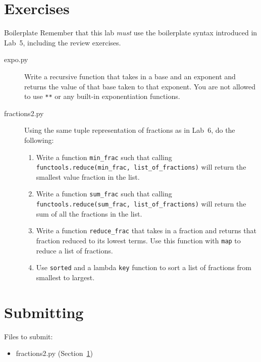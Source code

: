 \documentclass[11pt]{cselabheader}
\begin{document}
\pagebreak


\section{Exercises}
\label{sec:ex}

\begin{warningbox}{Boilerplate}
  Remember that this lab \emph{must} use the
  boilerplate syntax introduced in Lab~5, including the review exercises.
\end{warningbox}

\begin{description}
  \item[expo.py] Write a recursive function that takes in a base and an exponent
    and returns the value of that base taken to that exponent. You are not
    allowed to use \lstinline{**} or any built-in exponentiation functions.
  \item[fractions2.py] Using the same tuple representation of fractions as in
    Lab~6, do the following:

    \begin{enumerate}
      \item Write a function \lstinline{min_frac} such that calling
        \lstinline{functools.reduce(min_frac, list_of_fractions)} will return
        the smallest value fraction in the list.
      \item Write a function \lstinline{sum_frac} such that calling
        \lstinline{functools.reduce(sum_frac, list_of_fractions)} will return
        the sum of all the fractions in the list.
      \item Write a function \lstinline{reduce_frac} that takes in a fraction and
        returns that fraction reduced to its lowest terms. Use this function with
        \lstinline{map} to reduce a list of fractions.
      \item Use \lstinline{sorted} and a lambda \lstinline{key} function to sort
        a list of fractions from smallest to largest.
    \end{enumerate}
\end{description}

\pagebreak
\section{Submitting}

Files to submit:
\begin{itemize}
  \item fractions2.py (Section~\ref{sec:ex})
\end{itemize}
\end{document}
